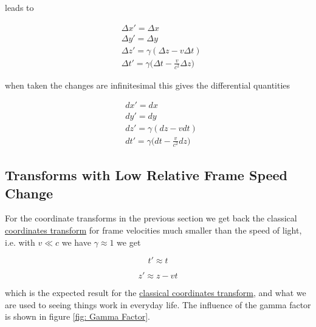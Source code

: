 leads to

\begin{equation}
	\label{eq: interval of Coordinates}
	\begin{aligned}
		 & \Delta x'= \Delta x                                            \\
		 & \Delta y'= \Delta y                                            \\
		 & \Delta z' = \gamma ( \Delta z-v \Delta t)                      \\
		 & \Delta t'=\gamma \bigg( \Delta t-\frac{v}{c^2} \Delta z \bigg)
	\end{aligned}
\end{equation}

when taken the changes are infinitesimal this gives the differential quantities

\begin{equation}
	\label{eq: Infintesmal interval of Coordinates}
	\begin{aligned}
		 & dx'=dx                                      \\
		 & dy'=dy                                      \\
		 & dz' = \gamma (dz-vdt)                       \\
		 & dt'=\gamma \bigg(dt-\frac{v}{c^2} dz \bigg)
	\end{aligned}
\end{equation}

\subsection{Transforms with Low Relative Frame Speed Change}

For the coordinate transforms in the previous section we get back the classical \hyperlink{def-galilean-transform}{coordinates transform} for frame velocities much smaller than the speed of light, i.e. with $v\ll c$ we have $\gamma \approx 1$ we get

\begin{equation}
	t' \approx t
\end{equation}

\begin{equation}
	z{'} \approx z - vt
\end{equation}

which is the expected result for the \hyperlink{def-galilean-transform}{classical coordinates transform}, and what we are used to seeing things work in everyday life. The influence of the gamma factor is shown in figure \ref{fig: Gamma Factor}.

